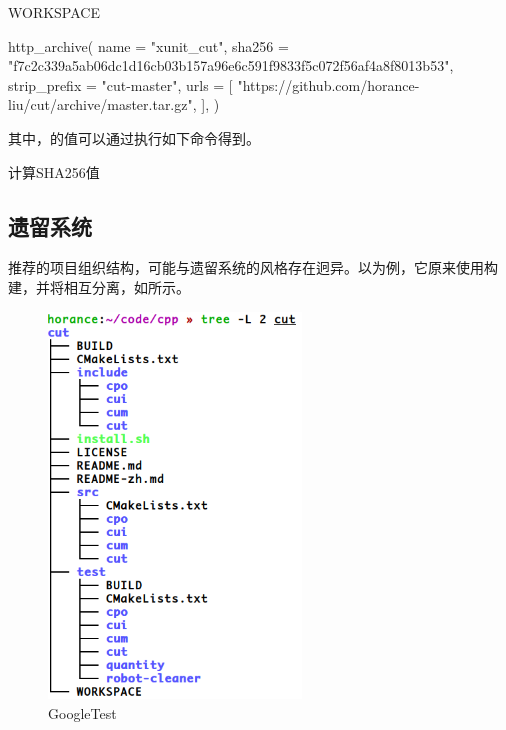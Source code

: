 \begin{content}
\begin{nodiff}{WORKSPACE}
 \begin{python}
http_archive(
    name = "xunit_cut",
    sha256 = "f7c2c339a5ab06dc1d16cb03b157a96e6c591f9833f5c072f56af4a8f8013b53",
    strip_prefix = "cut-master",
    urls = [
        "https://github.com/horance-liu/cut/archive/master.tar.gz",
    ],
)
 \end{python}
\end{nodiff}

其中，的值可以通过执行如下命令得到。

\begin{nodiff}{计算SHA256值}
\end{nodiff}

\subsection{遗留系统}

推荐的项目组织结构，可能与遗留系统的风格存在迥异。以为例，它原来使用构建，并将相互分离，如所示。

\begin{figure}[H]
\centering
\includegraphics[width=0.6\textwidth]{figures/bazel-concept-cut.png}
\caption{GoogleTest}
 \label{fig:bazel-concept-cut}
\end{figure}


\end{content}
